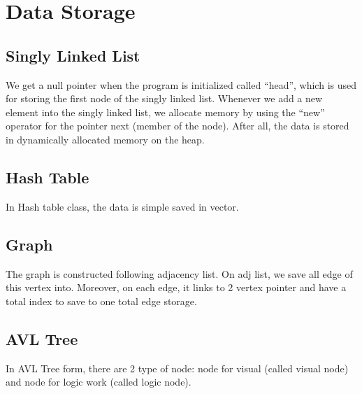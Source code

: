\section{Data Storage}
\subsection{Singly Linked List}
    We get a null pointer when the program is initialized called “head”, which is used for storing the first node of the singly linked list. Whenever we add a new element into the singly linked list, we allocate memory by using the “new” operator for the pointer next (member of the node). After all, the data is stored in dynamically allocated memory on the heap.
\subsection{Hash Table}
    In Hash table class, the data is simple saved in vector.
\subsection{Graph}
    The graph is constructed following adjacency list. 
    On adj list, we save all edge of this vertex into. 
    Moreover, on each edge, it links to 2 vertex pointer and have a total index to save to one total edge storage.
\subsection{AVL Tree}
    In AVL Tree form, there are 2 type of node: node for visual (called visual node) and node for logic work (called logic node).
